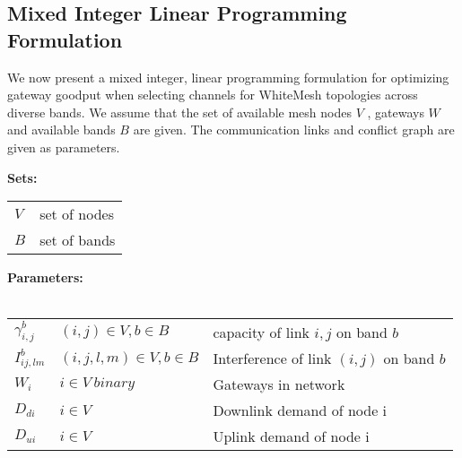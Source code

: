 \subsection{Mixed Integer Linear Programming Formulation}
\label{subsec:linearopt}

We now present a mixed integer, linear programming formulation for 
optimizing gateway goodput when selecting channels
for WhiteMesh topologies across diverse bands. We assume that the
set of available mesh nodes $V$ , gateways $W$ and available 
bands $B$ are given.  The communication links and conflict graph 
are given as parameters.

\noindent
{\bf Sets:}
\begin{tabular}{ll}
$V$ & set of nodes \\
$B$ & set of bands \\
\end{tabular}

\noindent
{\bf Parameters:}\\
\\
\begin{tabular}{llp{3.4cm}}
$\gamma_{i,j}^b$ & $(i,j)\in V, b \in B$ & capacity of link $i,j$ on band $b$\\
$I_{ij,lm}^b$ & $(i,j,l,m) \in V, b\in B $ & Interference of link $(i,j)$ on band $b$\\
$W_i$ & $i \in V\ binary$ & Gateways in network\\
$D_{di}$ & $i \in V\ $ & Downlink demand of node i\\
$D_{ui}$ & $i \in V\ $ & Uplink demand of node i\\
\end{tabular}

